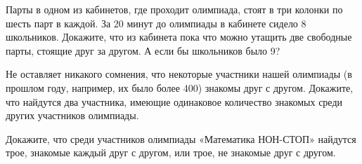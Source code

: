 ﻿
\begin{itemize}

\itA Парты в одном из кабинетов, где проходит олимпиада, стоят в три колонки по шесть парт в каждой. За 20 минут до олимпиады в кабинете сидело 8 школьников. Докажите, что из кабинета пока что можно утащить две свободные парты, стоящие друг за другом. А если бы школьников было 9?

\itB Не оставляет никакого сомнения, что некоторые участники нашей олимпиады (в прошлом году, например, их было более 400) знакомы друг с другом. Докажите, что найдутся два участника, имеющие одинаковое количество знакомых среди других участников олимпиады.

\itC Докажите, что среди участников олимпиады «Математика НОН-\linebreak СТОП» найдутся трое, знакомые каждый друг с другом, или трое, не знакомые друг с другом.
\end{itemize}